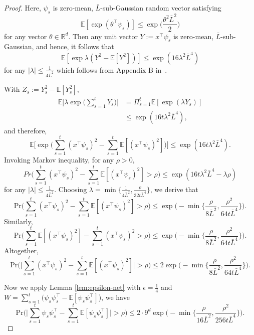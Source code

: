 \documentclass[11pt]{article}
\theoremstyle{plain}
\theoremstyle{definition}
\theoremstyle{remark}
\begin{document}
\begin{proof}
Here, $\psi_s$ is zero-mean, $\bar L$-sub-Gaussian random vector satisfying
\[
\mathbb{E}[\exp(\theta^\top \psi_s)]\leq \exp\bigg(\frac{\theta^2 {\bar L}^2}{2}\bigg)
\]
for any vector $\theta \in \mathbb{R}^d$. Then any unit vector $Y:=x^\top \psi_s$ is zero-mean, $\bar L$-sub-Gaussian, and hence, it follows that 
\[
\mathbb{E}[\exp \lambda (Y^2-\mathbb{E}[Y^2])] \leq \exp(16 \lambda^2 \bar L^4) 
\]
for any $|\lambda| \leq \frac{1}{4 \bar L^2}$ which follows from Appendix B in~\cite{honorio2014tight}.

With $Z_s:= Y_s^2 - \mathbb{E}[Y_s^2]$,
\begin{align*}
\mathbb{E}\bigg [\lambda \exp \bigg (\sum_{s=1}^t Y_s \bigg)\bigg ] &= \Pi_{s=1}^t \mathbb{E}[\exp(\lambda Y_s)]\\ 
& \leq \exp(16 t \lambda^2 \bar L^4),
\end{align*}
and therefore,
\[
\mathbb{E}\bigg[\exp\bigg(\sum_{s=1}^t (x^{\top}\psi_s)^2 - \sum_{s=1}^t  \mathbb{E}[(x^{\top}\psi_s)^2]\bigg)\bigg] \leq \exp(16 t \lambda^2 \bar L^4).
\]
Invoking Markov inequality, for any $\rho>0$, 
\[
Pr\bigg(\sum_{s=1}^t (x^{\top}\psi_s)^2 - \sum_{s=1}^t  \mathbb{E}[(x^{\top}\psi_s)^2] > \rho\bigg)  \leq \exp(16 t \lambda^2 \bar L^4-\lambda \rho)
\]
for any $|\lambda| \leq \frac{1}{4 \bar L^2}$. Choosing $\lambda=\min\{\frac{1}{4\bar L^2},\frac{\rho}{32 t \bar L^4 }\}$, we derive that
\[
\mathrm{Pr}\bigg(\sum_{s=1}^t (x^{\top}\psi_s)^2 - \sum_{s=1}^t  \mathbb{E}[(x^{\top}\psi_s)^2] > \rho \bigg)  \leq \exp\bigg(-\min\bigg \{\frac{\rho}{8 \bar L^2},\frac{\rho^2}{64t \bar L^4} \bigg \} \bigg).
\]
Similarly,
\[
\mathrm{Pr}\bigg(\sum_{s=1}^t  \mathbb{E}[(x^{\top}\psi_s)^2]-\sum_{s=1}^t (x^{\top}\psi_s)^2 > \rho
\bigg)  \leq \exp\bigg(-\min\bigg \{\frac{\rho}{8 \bar L^2},\frac{\rho^2}{64t \bar L^4}\bigg \}\bigg).
\]
Altogether,
\[
\mathrm{Pr}\bigg(\bigg|\sum_{s=1}^t (x^{\top}\psi_s)^2-\sum_{s=1}^t\mathbb{E}[(x^{\top}\psi_s)^2]\bigg| > \rho\bigg)  \leq 2\exp\bigg(-\min\bigg \{\frac{\rho}{8 \bar L^2},\frac{\rho^2}{64t \bar L^4}\bigg \}\bigg).
\]

Now we apply Lemma \ref{lem:epsilon-net} with $\epsilon = \frac{1}{4}$ and $W= \sum_{s=1}^{t}(\psi_s \psi_s^\top - \mathbb{E}[\psi_s \psi_s^\top]$), we have
\[
\mathrm{Pr}\bigg(\bigg|\sum_{s=1}^t \psi_s \psi_s^{\top} - \sum_{s=1}^t  \mathbb{E}[\psi_s \psi_s^{\top}]\bigg|> \rho \bigg) \leq 2\cdot9^d\exp \bigg(-\min\bigg \{\frac{\rho}{16 \bar L^2},\frac{\rho^2}{256t \bar L^4}\bigg \}\bigg).
\]


\end{proof}
\end{document}
